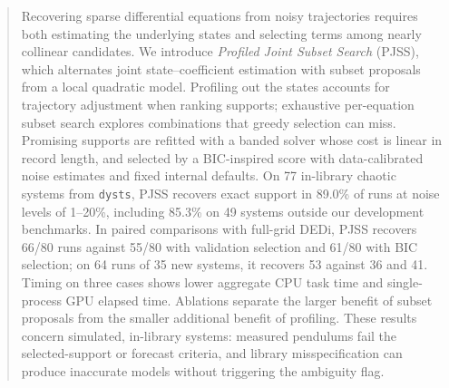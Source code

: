 \begin{abstract}
Recovering sparse differential equations from noisy trajectories requires both estimating the underlying states and selecting terms among nearly collinear candidates. We introduce \emph{Profiled Joint Subset Search} (PJSS), which alternates joint state--coefficient estimation with subset proposals from a local quadratic model. Profiling out the states accounts for trajectory adjustment when ranking supports; exhaustive per-equation subset search explores combinations that greedy selection can miss. Promising supports are refitted with a banded solver whose cost is linear in record length, and selected by a BIC-inspired score with data-calibrated noise estimates and fixed internal defaults. On 77 in-library chaotic systems from \texttt{dysts}, PJSS recovers exact support in 89.0\% of runs at noise levels of 1--20\%, including 85.3\% on 49 systems outside our development benchmarks. In paired comparisons with full-grid DEDi, PJSS recovers 66/80 runs against 55/80 with validation selection and 61/80 with BIC selection; on 64 runs of 35 new systems, it recovers 53 against 36 and 41. Timing on three cases shows lower aggregate CPU task time and single-process GPU elapsed time. Ablations separate the larger benefit of subset proposals from the smaller additional benefit of profiling. These results concern simulated, in-library systems: measured pendulums fail the selected-support or forecast criteria, and library misspecification can produce inaccurate models without triggering the ambiguity flag.
\end{abstract}
